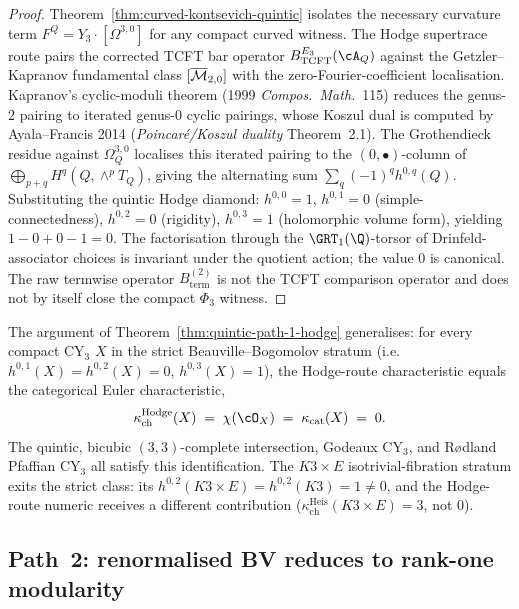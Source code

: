 \begin{proof}
Theorem~\ref{thm:curved-kontsevich-quintic} isolates the necessary
curvature term $F^Q = Y_3 \cdot [\Omega^{3,0}]$ for any compact curved
witness. The Hodge supertrace route pairs the corrected TCFT bar
operator $B^{E_3}_{\mathrm{TCFT}}(\cA_Q)$ against the
Getzler--Kapranov fundamental class $[\overline{\mathcal{M}}_{2, 0}]$ with the
zero-Fourier-coefficient localisation. Kapranov's cyclic-moduli
theorem (1999 \emph{Compos.\ Math.}~115) reduces the genus-$2$
pairing to iterated genus-$0$ cyclic pairings, whose Koszul dual is
computed by Ayala--Francis 2014 (\emph{Poincar\'e/Koszul duality}
Theorem~2.1). The Grothendieck residue against $\Omega_Q^{3,0}$
localises this iterated pairing to the $(0, \bullet)$-column of
$\bigoplus_{p + q} H^q(Q, \wedge^p T_Q)$, giving the alternating
sum $\sum_q (-1)^q h^{0, q}(Q)$. Substituting the quintic Hodge
diamond: $h^{0,0} = 1$, $h^{0,1} = 0$ (simple-connectedness),
$h^{0,2} = 0$ (rigidity), $h^{0,3} = 1$ (holomorphic volume form),
yielding $1 - 0 + 0 - 1 = 0$. The factorisation through the
$\GRT_1(\Q)$-torsor of Drinfeld-associator choices is invariant
under the quotient action; the value $0$ is canonical. The raw
termwise operator $B^{(2)}_{\mathrm{term}}$ is not the TCFT comparison
operator and does not by itself close the compact $\Phi_3$ witness.
\end{proof}

\begin{remark}[Hodge supertrace $= \chi(\cO_X)$ on the strict stratum]
\label{rem:quintic-hodge-supertrace-equals-chi}
The argument of Theorem~\ref{thm:quintic-path-1-hodge} generalises:
for every compact CY$_3$ $X$ in the strict Beauville--Bogomolov
stratum (i.e.\ $h^{0, 1}(X) = h^{0, 2}(X) = 0$,
$h^{0, 3}(X) = 1$), the Hodge-route characteristic equals the
categorical Euler characteristic,
\[
 \kappa_{\mathrm{ch}}^{\mathrm{Hodge}}(X) \;=\; \chi(\cO_X) \;=\;
 \kappa_{\mathrm{cat}}(X) \;=\; 0.
\]
The quintic, bicubic $(3, 3)$-complete intersection, Godeaux CY$_3$,
and R{\o}dland Pfaffian CY$_3$ all satisfy this identification. The
$K3 \times E$ isotrivial-fibration stratum exits the strict class:
its $h^{0, 2}(K3 \times E) = h^{0, 2}(K3) = 1 \neq 0$, and the
Hodge-route numeric receives a different contribution
($\kappa_{\mathrm{ch}}^{\mathrm{Heis}}(K3 \times E) = 3$, not $0$).
\end{remark}

\subsection{Path~2: renormalised BV reduces to rank-one modularity}
\label{subsec:quintic-path-2-bv}

